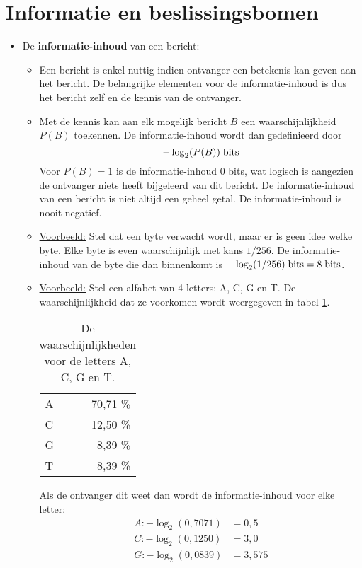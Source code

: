 \documentclass{report}
\begin{document}
\section{Informatie en beslissingsbomen}
\begin{itemize}
	\item De \textbf{informatie-inhoud} van een bericht:
	\begin{itemize}
		\item Een bericht is enkel nuttig indien ontvanger een betekenis kan geven aan het bericht. De belangrijke elementen voor de informatie-inhoud is dus het bericht zelf en de kennis van de ontvanger.
		\item Met de kennis kan aan elk mogelijk bericht $B$ een waarschijnlijkheid $P(B)$ toekennen. De informatie-inhoud wordt dan gedefinieerd door
		$$-\log_2(P(B))\; \hbox{bits}$$ 
		Voor $P(B) = 1$ is de informatie-inhoud 0 bits, wat logisch is aangezien de ontvanger niets heeft bijgeleerd van dit bericht.
		\alert De informatie-inhoud van een bericht is niet altijd een geheel getal.
		\alert De informatie-inhoud is nooit negatief.
		\item \underline{Voorbeeld:} Stel dat een byte verwacht wordt, maar er is geen idee welke byte. Elke byte is even waarschijnlijk met kans $1/256$. De informatie-inhoud van de byte die dan binnenkomt is $-\log_2 (1/256)\;\hbox{bits} = 8 \;\hbox{bits}$.
		\item \underline{Voorbeeld:} Stel een alfabet van 4 letters: A, C, G en T. De waarschijnlijkheid dat ze voorkomen wordt weergegeven in tabel \ref{table:example_entropy}.
		\begin{table}[h]
			\centering
			\begin{tabular}{l | r}
				A & 70,71 \% \\
				C & 12,50 \% \\
				G &  8,39 \% \\
				T & 8,39 \% \\
			\end{tabular}
			\caption{De waarschijnlijkheden voor de letters A, C, G en T.}
			\label{table:example_entropy}
		\end{table}
		Als de ontvanger dit weet dan wordt de informatie-inhoud voor elke letter:
		\begin{equation*}
			\begin{split}
				A: -\log_2(0,7071) & = 0,5 \\
				C: -\log_2(0,1250) & = 3,0 \\
				G: -\log_2(0,0839) & = 3,575\\

\end{split}
\end{equation*}
\end{itemize}
\end{itemize}
\end{document}
